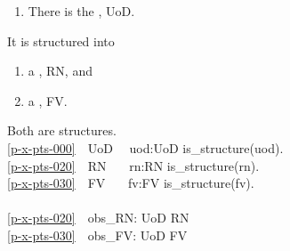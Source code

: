 \begin{enumerate}\setei
\item \label{p-x-pts-000} There is the ,
      \textsf{UoD}.
\savei\end{enumerate}
\noindent
It is structured into 
\begin{enumerate}\setei  
\item \label{p-x-pts-020} a , \textsf{RN}, and
\item \label{p-x-pts-030} a ,
  \textsf{FV}.  
  \savei\end{enumerate}
\pos{\end{multicols}}{}
\noindent
Both are structures. \dotfill %
{}
\bp
{}\\
\ref{p-x-pts-000}\ \ UoD\ \  {\ALL} uod:UoD {\RDOT} is\_structure(uod).\\
\ref{p-x-pts-020}\ \ RN\ \ \  {\ALL} rn:RN {\RDOT} is\_structure(rn).\\
\ref{p-x-pts-030}\ \ FV\ \ \  {\ALL} fv:FV {\RDOT} is\_structure(fv).\\
\\
\ref{p-x-pts-020}\ \ obs\_RN: UoD {\RIGHTARROW} RN \\
\ref{p-x-pts-030}\ \ obs\_FV: UoD {\RIGHTARROW} FV \eox
\ep
\pos{\end{multicols}}{}
\normalsize\rm 

\mnewfoil


